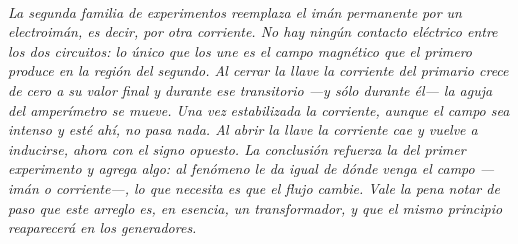 \begin{center}
\\[0.5em]
{\small\itshape La segunda familia de experimentos reemplaza el imán permanente
por un electroimán, es decir, por otra corriente. No hay ningún contacto
eléctrico entre los dos circuitos: lo único que los une es el campo magnético
que el primero produce en la región del segundo. Al cerrar la llave la corriente
del primario crece de cero a su valor final y durante ese transitorio ---y sólo
durante él--- la aguja del amperímetro se mueve. Una vez estabilizada la
corriente, aunque el campo sea intenso y esté ahí, no pasa nada. Al abrir la
llave la corriente cae y vuelve a inducirse, ahora con el signo opuesto. La
conclusión refuerza la del primer experimento y agrega algo: al fenómeno le da
igual de dónde venga el campo ---imán o corriente---, lo que necesita es que el
flujo cambie. Vale la pena notar de paso que este arreglo es, en esencia, un
transformador, y que el mismo principio reaparecerá en los generadores.}
\end{center}
